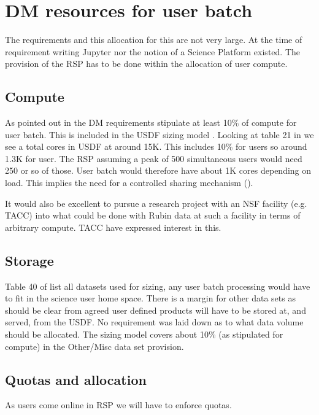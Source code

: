 \section{DM resources for user batch} \label{sec:resources}
The requirements and this allocation for this are not very large.
At the time of requirement writing Jupyter nor the notion of a Science Platform existed.
The provision of the RSP has to be done within the allocation of user compute.


\subsection{Compute} \label{sec:compute}
As pointed out in  the DM requirements stipulate at least
10\% of compute for user batch.
This is included in the USDF sizing model .
Looking at table 21 in  we see a total cores in USDF  at around 15K.
This includes 10\% for users so around 1.3K for user.
The RSP assuming a peak of 500 simultaneous users would need 250 or so of those.
User batch would therefore have about 1K cores depending on load.
This implies the need for a controlled sharing mechanism ().

It would also be excellent to pursue a research project with an NSF facility (e.g. TACC) into what could be done with Rubin data at such a facility in terms of arbitrary compute. TACC have expressed interest in this.



\subsection{Storage}
Table 40 of  list all datasets used for sizing,
any user batch processing would have to fit in the science user home space.
There is a margin for other data sets as should be clear from  agreed user defined products will have to be stored at, and served, from the USDF.
No requirement was laid down as to what data volume should be allocated.
The sizing model covers about 10\%  (as stipulated for compute) in the Other/Misc data set provision.


\subsection{Quotas and allocation} \label{sec:quotas}

As users come online in RSP we will have to enforce quotas.

